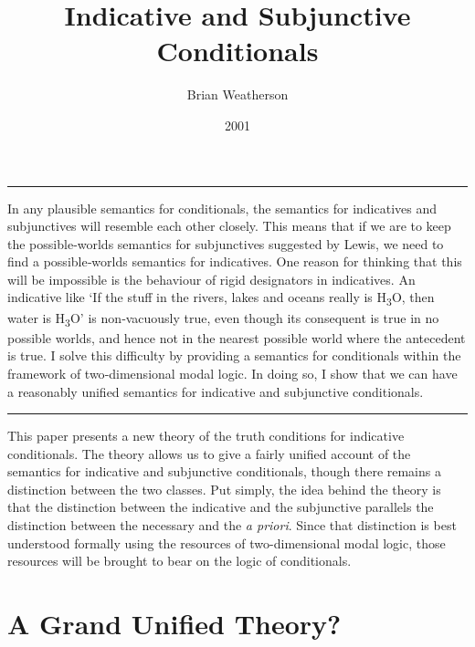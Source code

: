 \documentclass[
  10pt,
  letterpaper,
  DIV=11,
  numbers=noendperiod,
  twoside]{scrartcl}
\title{Indicative and Subjunctive Conditionals}
\author{Brian Weatherson}
\date{2001}
\renewenvironment{abstract}
 {\vspace{-1.25cm}
 \quotation\small\noindent\rule{\linewidth}{.5pt}\par\smallskip
 \noindent }
 {\par\noindent\rule{\linewidth}{.5pt}\endquotation}
\begin{document}
\maketitle
\begin{abstract}
In any plausible semantics for conditionals, the semantics for
indicatives and subjunctives will resemble each other closely. This
means that if we are to keep the possible‐worlds semantics for
subjunctives suggested by Lewis, we need to find a possible‐worlds
semantics for indicatives. One reason for thinking that this will be
impossible is the behaviour of rigid designators in indicatives. An
indicative like `If the stuff in the rivers, lakes and oceans really is
H\textsubscript{3}O, then water is H\textsubscript{3}O' is non‐vacuously
true, even though its consequent is true in no possible worlds, and
hence not in the nearest possible world where the antecedent is true. I
solve this difficulty by providing a semantics for conditionals within
the framework of two‐dimensional modal logic. In doing so, I show that
we can have a reasonably unified semantics for indicative and
subjunctive conditionals.
\end{abstract}

This paper presents a new theory of the truth conditions for indicative
conditionals. The theory allows us to give a fairly unified account of
the semantics for indicative and subjunctive conditionals, though there
remains a distinction between the two classes. Put simply, the idea
behind the theory is that the distinction between the indicative and the
subjunctive parallels the distinction between the necessary and the
\emph{a priori}. Since that distinction is best understood formally
using the resources of two-dimensional modal logic, those resources will
be brought to bear on the logic of conditionals.

\section{A Grand Unified Theory?}\label{a-grand-unified-theory}
\end{document}
